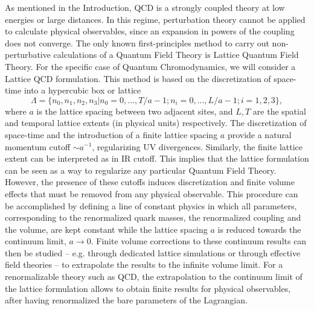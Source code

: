 As mentioned in the Introduction, QCD is a strongly coupled theory at low energies or large distances. In this regime, perturbation theory cannot be applied to calculate physical observables, since an expansion in powers of the coupling does not converge. The only known first-principles method to carry out non-perturbative calculations of a Quantum Field Theory is Lattice Quantum Field Theory.  For the specific case of Quantum Chromodynamics, we will consider a Lattice QCD formulation. This method is based on the discretization of space-time into a hypercubic box or lattice
\begin{equation}
\Lambda=\{n_0,n_1,n_2,n_3|n_0=0,...,T/a-1;n_i=0,...,L/a-1;i=1,2,3\},
\end{equation} 
where $a$ is the lattice spacing between two adjacent sites, and $L,T$ are the spatial and temporal lattice extents (in physical units) respectively. The discretization of space-time and the introduction of a finite lattice spacing $a$ provide a natural momentum cutoff $\sim a^{-1}$, regularizing UV divergences. Similarly, the finite lattice extent can be interpreted as in IR cutoff. This implies that the lattice formulation can be seen as a way to regularize any particular Quantum Field Theory. However, the presence of these cutoffs induces discretization and finite volume effects that must be removed from any physical observable. This procedure can be accomplished by defining a line of constant physics in which all parameters, corresponding to the renormalized quark masses, the renormalized coupling and the volume, are kept constant while the lattice spacing $a$ is reduced towards the continuum limit, $a\rightarrow0$. Finite volume corrections to these continuum results can then be studied -- e.g. through dedicated lattice simulations or through effective field theories -- to extrapolate the results to the  infinite volume limit. For a renormalizable theory such as QCD,  the extrapolation to the  continuum limit of the lattice  formulation allows to obtain finite results for physical observables, after having renormalized the bare parameters of the Lagrangian.


